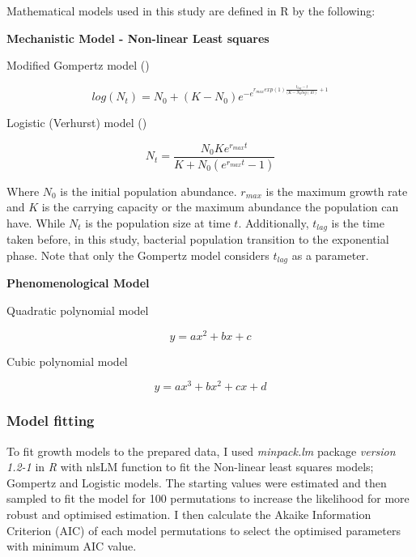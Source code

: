\documentclass[12pt]{article}
\begin{document}
\begin{linenumbers}
  \noindent Mathematical models used in this study are defined in R by the following:
    
    \noindent\textbf{Mechanistic Model - Non-linear Least squares}

    \noindent Modified Gompertz model (\cite{zwietering_modeling_1990})
    
    \begin{equation}
        log(N_{t}) = N_{0} + (K - N_{0})e^{-e^{r_{max}exp(1)\frac{t_{lag}-t}{(K-N_{0}log(10)}+1}}
    \end{equation}
    
    \noindent Logistic (Verhurst) model (\cite{peleg_modeling_1997})
    
    \begin{equation}
        N_{t} = \frac{N_{0}Ke^{r_{max}t}}{K + N_{0}(e^{r_{max}t}-1)}
    \end{equation}
    
    \noindent Where \(N_{0}\) is the initial population abundance. \(r_{max}\) is the maximum growth rate and \(K\) is the carrying capacity or the maximum abundance the population can have. While \(N_{t}\) is the population size at time \(t\). Additionally, \(t_{lag}\) is the time taken before, in this study, bacterial population transition to the exponential phase. Note that only the Gompertz model considers \(t_{lag}\) as a parameter.
    
    \noindent\textbf{Phenomenological Model}
    
    \noindent Quadratic polynomial model
    
    \begin{equation}
        y = ax^{2} + bx + c
    \end{equation}

    \noindent Cubic polynomial model
    
    \begin{equation}
        y = ax^{3} + bx^{2} + cx + d
    \end{equation}
    
\subsubsection{Model fitting}

\noindent To fit growth models to the prepared data, I used \textit{minpack.lm} package \textit{version 1.2-1} in \textit{R} with nlsLM function to fit the Non-linear least squares models; Gompertz and Logistic models. The starting values were estimated and then sampled to fit the model for 100 permutations to increase the likelihood for more robust and optimised estimation. I then calculate the Akaike Information Criterion (AIC) of each model permutations to select the optimised parameters with minimum AIC value. 


\end{linenumbers}
\end{document}
